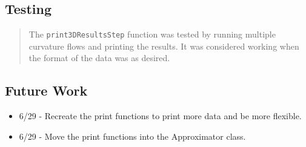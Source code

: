 \subsection*{Testing}

\begin{quotation}
The \texttt{print3DResultsStep} function was tested by running multiple
curvature flows and printing the results. It was considered working when the
format of the data was as desired.
\end{quotation}

\subsection*{Future Work}

\begin{itemize}
\item 6/29 - Recreate the print functions to print more data and be more
flexible.

\item 6/29 - Move the print functions into the Approximator class.
\end{itemize}


%
